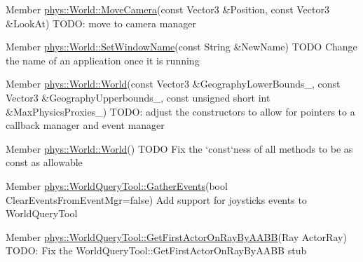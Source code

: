 \label{dd/da0/todo__todo000022}
\hypertarget{dd/da0/todo__todo000022}{}
 
\begin{DoxyDescription}
\item[Member \hyperlink{classphys_1_1World_aed87ebc1e559c3057132c50bba16117f}{phys::World::MoveCamera}(const Vector3 \&Position, const Vector3 \&LookAt) ]TODO: move to camera manager 
\end{DoxyDescription}

\label{dd/da0/todo__todo000021}
\hypertarget{dd/da0/todo__todo000021}{}
 
\begin{DoxyDescription}
\item[Member \hyperlink{classphys_1_1World_acd0dff342c08fe3008226488b7c53d97}{phys::World::SetWindowName}(const String \&NewName) ]TODO Change the name of an application once it is running 
\end{DoxyDescription}

\label{dd/da0/todo__todo000016}
\hypertarget{dd/da0/todo__todo000016}{}
 
\begin{DoxyDescription}
\item[Member \hyperlink{classphys_1_1World_aa74e4e6053044c3ecec87fdbf7880c18}{phys::World::World}(const Vector3 \&GeographyLowerBounds\_\-, const Vector3 \&GeographyUpperbounds\_\-, const unsigned short int \&MaxPhysicsProxies\_\-=1024) ]TODO: adjust the constructors to allow for pointers to a callback manager and event manager 
\end{DoxyDescription}

\label{dd/da0/todo__todo000015}
\hypertarget{dd/da0/todo__todo000015}{}
 
\begin{DoxyDescription}
\item[Member \hyperlink{classphys_1_1World_a7f762724406c874250c3dc8910a1e695}{phys::World::World}() ]TODO Fix the `const`ness of all methods to be as const as allowable 
\end{DoxyDescription}

\label{dd/da0/todo__todo000023}
\hypertarget{dd/da0/todo__todo000023}{}
 
\begin{DoxyDescription}
\item[Member \hyperlink{classphys_1_1WorldQueryTool_ae387ff047f3cdf408d8959b8cbf4cc57}{phys::WorldQueryTool::GatherEvents}(bool ClearEventsFromEventMgr=false) ]Add support for joysticks events to WorldQueryTool 
\end{DoxyDescription}

\label{dd/da0/todo__todo000024}
\hypertarget{dd/da0/todo__todo000024}{}
 
\begin{DoxyDescription}
\item[Member \hyperlink{classphys_1_1WorldQueryTool_a67575416c2e9c652bbd873649ee38baf}{phys::WorldQueryTool::GetFirstActorOnRayByAABB}(Ray ActorRay) ]TODO: Fix the WorldQueryTool::GetFirstActorOnRayByAABB stub 
\end{DoxyDescription}